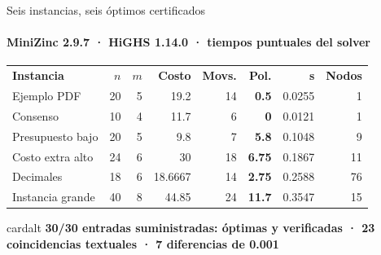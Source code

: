 \documentclass[aspectratio=169,10pt]{beamer}
\newcommand{\speakername}{Equipo MinPol}
\newcommand{\speakertime}{12 minutos}
\newcommand{\speaker}[2]{\gdef\speakername{#1}\gdef\speakertime{#2}}
\begin{document}
\speaker{Juan Esteban Rodriguez Valencia}{6:35--7:20}
\begin{frame}{Seis instancias, seis óptimos certificados}
  \framesubtitle{MiniZinc 2.9.7 · HiGHS 1.14.0 · tiempos puntuales del solver}
  \vspace{0.05cm}\centering\scriptsize
  \setlength{\tabcolsep}{4.2pt}
  \renewcommand{\arraystretch}{1.35}
  \begin{tabular}{>{\raggedright\arraybackslash}p{3.0cm}rrrrrrr}
    \rowcolor{tealdark}
    \color{white}\bfseries Instancia & \color{white}\bfseries $n$ & \color{white}\bfseries $m$ & \color{white}\bfseries Costo & \color{white}\bfseries Movs. & \color{white}\bfseries Pol. & \color{white}\bfseries s & \color{white}\bfseries Nodos \\
    \rowcolor{navytwo} Ejemplo PDF & 20 & 5 & 19.2 & 14 & \bfseries 0.5 & 0.0255 & 1 \\
    \rowcolor{navythree} Consenso & 10 & 4 & 11.7 & 6 & \color{green}\bfseries 0 & 0.0121 & 1 \\
    \rowcolor{navytwo} Presupuesto bajo & 20 & 5 & 9.8 & 7 & \bfseries 5.8 & 0.1048 & 9 \\
    \rowcolor{navythree} Costo extra alto & 24 & 6 & 30 & 18 & \bfseries 6.75 & 0.1867 & 11 \\
    \rowcolor{navytwo} Decimales & 18 & 6 & 18.6667 & 14 & \bfseries 2.75 & 0.2588 & 76 \\
    \rowcolor{navythree} Instancia grande & 40 & 8 & 44.85 & 24 & \bfseries 11.7 & 0.3547 & 15 \\
  \end{tabular}\vspace{0.35cm}
  \begin{beamercolorbox}[wd=14.4cm,sep=0.15cm,center,rounded=true]{cardalt}
    \bfseries 30/30 entradas suministradas: óptimas y verificadas · 23 coincidencias textuales · 7 diferencias de 0.001
  \end{beamercolorbox}
\end{frame}
\end{document}
